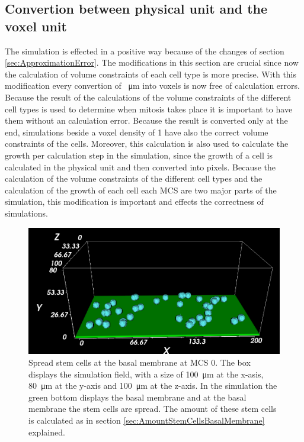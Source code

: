 \subsection{Convertion between physical unit and the voxel unit}
The simulation is effected in a positive way because of the changes of section \ref{sec:ApproximationError}. The modifications in this section are crucial since now the calculation of volume constraints of each cell type is more precise. With this modification every convertion of \SI{}{\micro\metre} into voxels is now free of calculation errors. Because the result of the calculations of the volume constraints of the different cell types is used to determine when mitosis takes place it is important to have them without an calculation error. Because the result is converted only at the end, simulations beside a voxel density of 1 have also the correct volume constraints of the cells. Moreover, this calculation is also used to calculate the growth per calculation step in the simulation, since the growth of a cell is calculated in the physical unit and then converted into pixels. Because the calculation of the volume constraints of the different cell types and the calculation of the growth of each cell each \ac{MCS} are two major parts of the simulation, this modification is important and effects the correctness of simulations.
\newline
\newline

\begin{figure}[ht]
	\center
	\includegraphics[scale=0.4]{figures/SimulationAtMCS0.png}
	\caption[Spread stem cells at the basal membrane at \ac{MCS} 0]{Spread stem cells at the basal membrane at \ac{MCS} 0. The box displays the simulation field, with a size of \SI{100}{\micro\metre} at the x-asis, \SI{80}{\micro\metre} at the y-axis and \SI{100}{\micro\metre} at the z-axis. In the simulation the green bottom displays the basal membrane and at the basal membrane the stem cells are spread. The amount of these stem cells is calculated as in section \ref{sec:AmountStemCellsBasalMembrane} explained.}
	\label{img:SimulationAtMCS0}
\end{figure}


